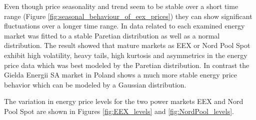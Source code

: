 Even though price seasonality and trend seem to be stable over a short time range (Figure \ref{fig:seasonal_behaviour_of_eex_prices}) they can show significant fluctuations over a longer time range. In \cite{mugele2005stable} data related to each examined energy market was fitted to a stable Paretian distribution as well as a normal distribution. The result showed that mature markets as EEX or Nord Pool Spot exhibit high volatility, heavy tails, high kurtosis and asymmetrics in the energy price data which was best modeled by the Paretian distribution. In contrast the Gielda Energii SA market in Poland shows a much more stable energy price behavior which can be modeled by a Gaussian distribution. 

The variation in energy price levels for the two power markets EEX and Nord Pool Spot are shown in Figures \ref{fig:EEX_levels} and \ref{fig:NordPool_levels}.

